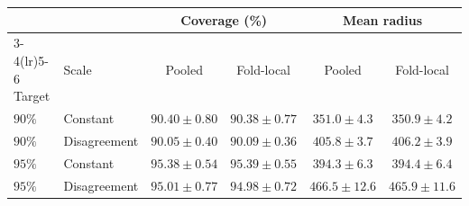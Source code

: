 \begin{tabular}{llcccc}
\toprule
& & \multicolumn{2}{c}{Coverage (\%)} & \multicolumn{2}{c}{Mean radius} \\
\cmidrule(lr){3-4}\cmidrule(lr){5-6}
Target & Scale & Pooled & Fold-local & Pooled & Fold-local \\
\midrule
$90\%$ & Constant & $90.40\pm0.80$ & $90.38\pm0.77$ & $351.0\pm4.3$ & $350.9\pm4.2$ \\
$90\%$ & Disagreement & $90.05\pm0.40$ & $90.09\pm0.36$ & $405.8\pm3.7$ & $406.2\pm3.9$ \\
$95\%$ & Constant & $95.38\pm0.54$ & $95.39\pm0.55$ & $394.3\pm6.3$ & $394.4\pm6.4$ \\
$95\%$ & Disagreement & $95.01\pm0.77$ & $94.98\pm0.72$ & $466.5\pm12.6$ & $465.9\pm11.6$ \\
\bottomrule
\end{tabular}
